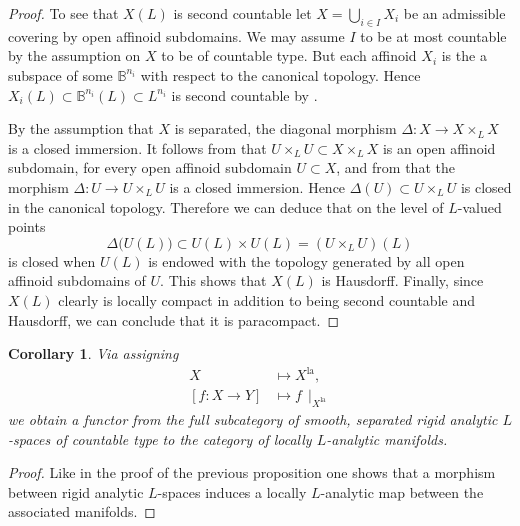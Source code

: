 \documentclass[a4paper, reqno, 10pt]{amsart}
\newtheorem{corollary}[theorem]{Corollary}
\theoremstyle{definition}
\numberwithin{equation}{section}
\newcommand{\la}{{\mathrm{la}}}
\newcommand{\lto}{\longmapsto}
\newcommand{\ra}{\rightarrow}
\newcommand{\res}[1]{{\!\,\mid_{#1}}}
\newcommand{\BB}{{\mathbb {B}}}
\begin{document}
\begin{proof}
	
	To see that $X(L)$ is second countable let $X = \bigcup_{i\in I} X_i$ be an admissible covering by open affinoid subdomains.
	We may assume $I$ to be at most countable by the assumption on $X$ to be of countable type.
	But each affinoid $X_i$ is the a subspace of some $\BB^{n_i}$ with respect to the canonical topology.
	Hence $X_i(L) \subset \BB^{n_i}(L) \subset L^{n_i}$ is second countable by .
	
	
	By the assumption that $X$ is separated, the diagonal morphism $\Delta \colon X \ra X \times_L X$ is a closed immersion.
	It follows from \cite[9.3.5 Lemma 3]{BoschGuentzerRemmert84NonArchAna} that $U \times_L U \subset X \times_L X$ is an open affinoid subdomain, for every open affinoid subdomain $U \subset X$, and from \cite[9.5.3 Prop.\ 2]{BoschGuentzerRemmert84NonArchAna} that the morphism $\Delta \colon U \ra U\times_L U$ is a closed immersion. 
	Hence $\Delta(U) \subset U \times_L U$ is closed in the canonical topology.
	Therefore we can deduce that on the level of $L$-valued points
	\[ \Delta\big(U(L)\big) \subset U(L) \times U(L) = (U \times_L U)(L) \]
	is closed when $U(L)$ is endowed with the topology generated by all open affinoid subdomains of $U$.
	This shows that $X(L)$ is Hausdorff.
	Finally, since $X(L)$ clearly is locally compact in addition to being second countable and Hausdorff, we can conclude that it is paracompact.
\end{proof}


\begin{corollary}\label{Cor 1 - Local analytification functor}
	Via assigning
	\begin{align*}
		X &\lto X^\la,  \\
		[f\colon X \ra Y] &\lto f\res{X^\la}
	\end{align*}
	we obtain a functor from the full subcategory of smooth, separated rigid analytic $L$-spaces of countable type to the category of locally $L$-analytic manifolds.
\end{corollary}
\begin{proof}
	Like in the proof of the previous proposition one shows that a morphism between rigid analytic $L$-spaces induces a locally $L$-analytic map between the associated manifolds.
\end{proof}
\end{document}
